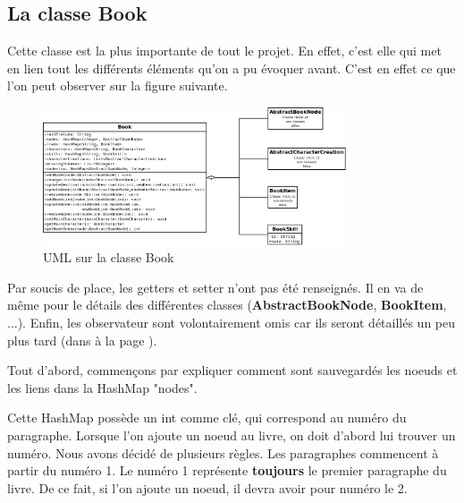 		\subsection{La classe Book}
			\label{book}

			Cette classe est la plus importante de tout le projet. En effet, c'est elle qui met en lien tout les différents éléments qu'on a pu évoquer avant. C'est en effet ce que l'on peut observer sur la figure suivante.

			\begin{figure}[H]
				\centering\includegraphics[width=0.8\textwidth, keepaspectratio]{img/book.png}
				\caption{UML sur la classe Book}
			\end{figure}

			Par soucis de place, les getters et setter n'ont pas été renseignés. Il en va de même pour le détails des différentes classes (\textbf{AbstractBookNode}, \textbf{BookItem}, ...). Enfin, les observateur sont volontairement omis car ils seront détaillés un peu plus tard (dans  à la page \pageref{subsec:pattern_observer}).

			Tout d'abord, commençons par expliquer comment sont sauvegardés les noeuds et les liens dans la HashMap "nodes".

			Cette HashMap possède un int comme clé, qui correspond au numéro du paragraphe. Lorsque l'on ajoute un noeud au livre, on doit d'abord lui trouver un numéro. Nous avons décidé de plusieurs règles. Les paragraphes commencent à partir du numéro 1. Le numéro 1 représente \textbf{toujours} le premier paragraphe du livre. De ce fait, si l'on ajoute un noeud, il devra avoir pour numéro le 2.

